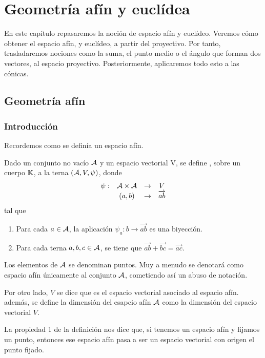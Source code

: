 \chapter{Geometría afín y euclídea}
En este capítulo repasaremos la noción de espacio afín y euclídeo. Veremos cómo obtener el espacio afín, y euclídeo, a partir del proyectivo. Por tanto, trasladaremos nociones como la suma, el punto medio o el ángulo que forman dos vectores, al espacio proyectivo. Posteriormente, aplicaremos todo esto a las cónicas.

\section{Geometría afín}
\subsection{Introducción}
Recordemos como se definía un espacio afín.
\begin{defi}\label{C9_def_espacio_afin}
	Dado un conjunto no vacío $\mathcal{A}$ y un espacio vectorial V, se define , sobre un cuerpo $\mathbb{K}$, a la terna $(\mathcal{A},V,\psi)$, donde
	\begin{equation*}
		\begin{array}{cccc}
			\psi: & \mathcal{A} \times \mathcal{A} & \rightarrow &V\\
			& (a,b) & \rightarrow & \overrightarrow{ab}
		\end{array}
	\end{equation*}
	tal que 
	\begin{enumerate}
		\item Para cada $a\in\mathcal{A}$, la aplicación $\psi_a: b\rightarrow \overrightarrow{ab}$ es una biyección.
		
		\item Para cada terna $a,b,c\in\mathcal{A}$, se tiene que $\overrightarrow{ab}+\overrightarrow{bc}=\overrightarrow{ac}$.
	\end{enumerate}
\end{defi}
Los elementos de $\mathcal{A}$ se denominan puntos. Muy a menudo se denotará como espacio afín únicamente al conjunto $\mathcal{A}$, cometiendo así un abuso de notación.

Por otro lado, $V$ se dice que es el espacio vectorial asociado al espacio afín. además, se define la dimensión del esapcio afín $\mathcal{A}$ como la dimensión del espacio vectorial $V$.

La propiedad 1 de la definición nos dice que, si tenemos un espacio afín y fijamos un punto, entonces ese espacio afín pasa a ser un espacio vectorial con origen el punto fijado.

